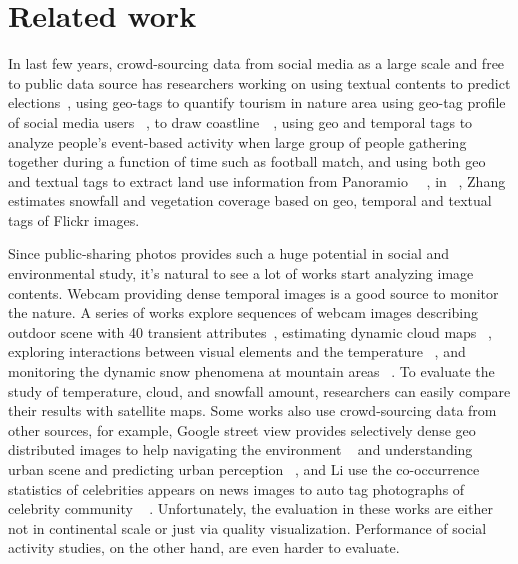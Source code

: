 \section{Related work}
In last few years, crowd-sourcing data from social media 
as a large scale and free to public data source
has  
researchers working on using textual contents to
predict elections~\cite{you2015multifacetedelections},
using geo-tags to quantify
tourism in nature area using geo-tag profile of social media users ~\cite{wood2013usingtourism},
to draw coastline~\cite{omori2014can}~\cite{Can geo-tags on flickr draw coastlines?}, 
using geo and temporal tags to analyze people's event-based activity when large group of people gathering together during a function of time such as football match,
and using both geo and textual tags to 
extract land use information from Panoramio~\cite{vsecerov2015analysis} ~\cite{Analysis of panoramio photo tags in order to extract land use information, Towards Better Land Cover Classification Using Geo-tagged Photographs},
in~\cite{ecology2012www} , Zhang \etal estimates  snowfall and vegetation coverage 
based on geo, temporal and textual tags of Flickr images. 

Since public-sharing photos provides such a huge potential in social and environmental study, it's 
natural to see a lot of works start analyzing image contents. Webcam providing dense temporal images 
is a good source to monitor the nature. A series of works explore sequences 
of webcam images describing outdoor scene with 40 transient attributes~\cite{transattri}, estimating dynamic cloud maps ~\cite{murdock2015building, murdock}, exploring interactions between visual elements and the temperature  ~\cite{hot or not}, and monitoring the dynamic snow phenomena at mountain areas ~\cite{fedorov2015snowwatch, fedorov2014snow}. 
To evaluate the study of temperature, cloud, and snowfall amount,
 researchers can easily compare their results with satellite maps. 
Some works also use crowd-sourcing data from other sources, for example, Google street view provides selectively dense geo distributed images to help navigating the environment ~\cite{khosla2014looking} and understanding urban scene and predicting urban perception ~\cite{porzi2015predicting}, and Li \etal use the co-occurrence statistics of celebrities appears on news images to auto tag photographs of celebrity community ~\cite{li2015celebritynet}
. 
Unfortunately, 
the evaluation in these works are either not in continental scale or just via quality visualization.
Performance of social activity studies, on the other hand, are even harder to evaluate.

